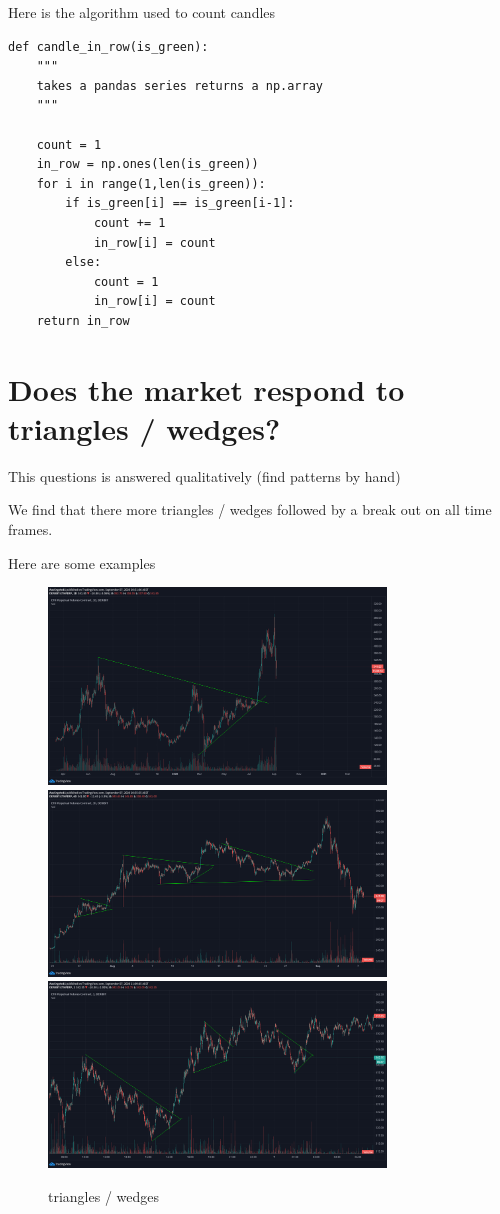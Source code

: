 Here is the algorithm used to count candles

\begin{verbatim}
def candle_in_row(is_green):
    """
    takes a pandas series returns a np.array
    """
    
    count = 1
    in_row = np.ones(len(is_green))
    for i in range(1,len(is_green)):
        if is_green[i] == is_green[i-1]:
            count += 1
            in_row[i] = count
        else:
            count = 1
            in_row[i] = count
    return in_row 
\end{verbatim}
\section{ Does the market respond to triangles / wedges?}
This questions is answered qualitatively (find patterns by hand)

We find that there more triangles / wedges followed by a break out on all time frames.

Here are some examples
\begin{figure}[H]
\center
\includegraphics[width=0.8\textwidth]{fig/tri/t1.png}
\includegraphics[width=0.8\textwidth]{fig/tri/t2.png}
\includegraphics[width=0.8\textwidth]{fig/tri/t3.png}
\caption{triangles / wedges}

\end{figure}

